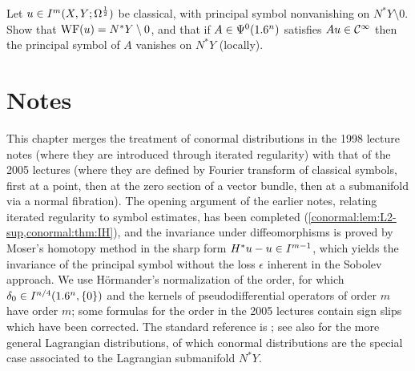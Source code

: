 \begin{exercise}\label{conormal:ex:WF-exact}
  Let $u\in I^{m}(X,Y;\Omega^{\frac12})$ be classical, with principal symbol nonvanishing
  on $N^*Y\setminus0$.  Show that $\operatorname{WF}(u)=N^*Y\setminus0$, and that if
  $A\in\Psi^{0}(1.6^n)$ satisfies $Au\in\mathcal{C}^\infty$ then the principal symbol of $A$
  vanishes on $N^*Y$ (locally).
\end{exercise}

\section*{Notes}
This chapter merges the treatment of conormal distributions in the 1998 lecture
notes (where they are introduced through iterated regularity) with that of the
2005 lectures (where they are defined by Fourier transform of classical symbols,
first at a point, then at the zero section of a vector bundle, then at a
submanifold via a normal fibration).  The opening argument of the earlier notes,
relating iterated regularity to symbol estimates, has been completed
(\cref{conormal:lem:L2-sup,conormal:thm:IH}), and the invariance under
diffeomorphisms is proved by Moser's homotopy method in the sharp form
$H^*u-u\in I^{m-1}$, which yields the invariance of the principal symbol without
the loss $\epsilon$ inherent in the Sobolev approach.  We use H\"ormander's
normalization of the order, for which $\delta_0\in I^{n/4}(1.6^n,\{0\})$ and the
kernels of pseudodifferential operators of order $m$ have order $m$; some
formulas for the order in the 2005 lectures contain sign slips which have been
corrected.  The standard reference is \cite[Section~18.2]{Hormander-III}; see also
\cite{Hormander-FIO} for the more general Lagrangian distributions, of which
conormal distributions are the special case associated to the Lagrangian
submanifold $N^*Y$.
